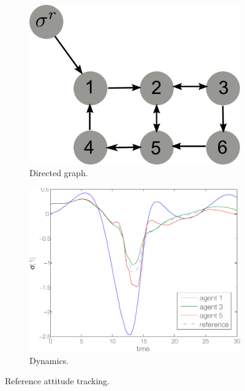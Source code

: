 \begin{figure}
\centering
\begin{subfigure}{0.3\linewidth}
\includegraphics[width=\linewidth]{./images/rat_graph}
\caption{Directed graph.}
\label{fig:rat:sims:graph}
\end{subfigure}
\begin{subfigure}{0.3\linewidth}
\includegraphics[width=\linewidth]{./images/rat_D1_1_3_5_dyn}
\caption{Dynamics.}
\label{fig:rat:sims:dyn}
\end{subfigure}
\caption{Reference attitude tracking.}
\label{fig:rat:sims}
\end{figure}

